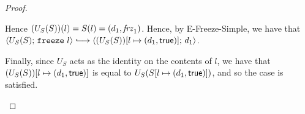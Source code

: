 \begin{proof}
\begin{itemize}
\begin{itemize}
          Hence $(U_S(S))(l) = S(l) = (d_1, \mathit{frz}_1)$.  Hence,
          by {\sc E-Freeze-Simple}, we have that
          $\config{U_S(S)}{\freeze{l}} \parstepsto
          \config{\extS{(U_S(S))}{l}{d_1}{\frozentrue}}{d_1}$.

          Finally, since $U_S$ acts as the identity on the contents of
          $l$, we have that $(U_S(S))[l \mapsto (d_1, \textsf{true})]$ is
          equal to $U_S(S[l \mapsto (d_1, \textsf{true})])$, and so the
          case is satisfied.
      \end{itemize}

  \end{itemize}
\end{proof}

